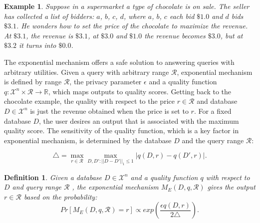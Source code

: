 \documentclass[a4paper, 11pt]{article} %
\newtheorem{definition}{Definition}[section]
\newtheorem{example}{Example}[section]
\begin{document}
\begin{example}
Suppose in a supermarket a type of chocolate is on sale. The seller has collected a list of bidders: $a$, $b$, $c$, $d$, where $a$, $b$, $c$ each bid $\$1.0$ and $d$ bids $\$3.1$. He wonders how to set the price of the chocolate to maximize the revenue. At $\$3.1$, the revenue is $\$3.1$, at $\$3.0$ and $\$1.0$ the revenue becomes $\$3.0$, but at $\$3.2$ it turns into $\$0.0$.
\end{example}

The exponential mechanism offers a safe solution to answering queries with arbitrary utilities. Given a query with arbitrary range $\mathcal{R}$, exponential mechanism is defined by range $\mathcal{R}$, the privacy parameter $\epsilon$ and a quality function $q:\mathcal{X}^n \times \mathcal{R} \rightarrow \mathbb{R}$, which maps outputs to quality scores. Getting back to the chocolate example, the quality with respect to the price $r\in \mathcal{R}$ and database $D \in  \mathcal{X}^n $ is just the revenue obtained when the price is set to $r$. For a fixed database $D$, the user desires an output that is associated with the maximum quality score. The sensitivity of the quality function, which is a key factor in exponential mechanism, is determined by the database $D$ and the query range $\mathcal{R}$:

\begin{equation}
\triangle = \max_{r \in \mathcal{R}} \max_{D,D':||D-D'||_1 \leq 1} |q(D, r)-q(D',r)|.
\end{equation}

\begin{definition}
Given a database $D \in  \mathcal{X}^n$ and a quality function $q$ with respect to $D$ and query range $\mathcal{R}$ , the exponential mechanism $M_E(D, q, \mathcal{R})$ gives the output $r \in \mathcal{R}$ based on the probability:
$$Pr[M_E(D, q, \mathcal{R}) = r] \propto exp(\frac{\epsilon q(D, r)}{2\triangle}).$$
\end{definition}
\end{document}
